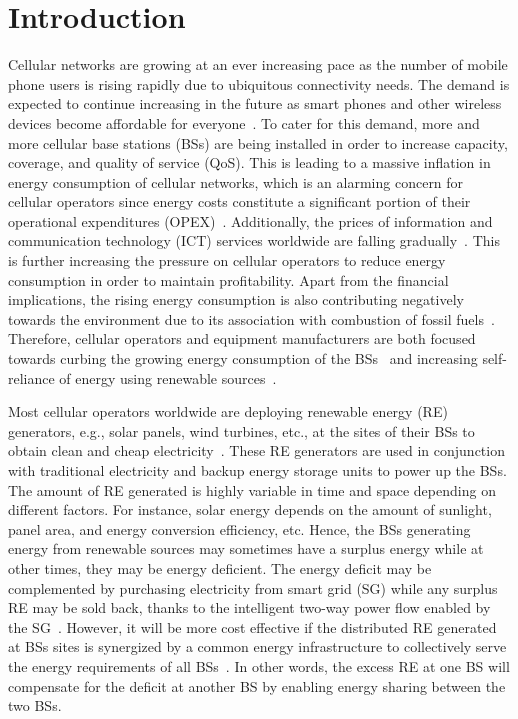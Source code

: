 \documentclass[10pt, letter,twocolumn]{IEEEtran}
\begin{document}
\section{Introduction}
Cellular networks are growing at an ever increasing pace as the number of mobile phone users is rising rapidly due to ubiquitous connectivity needs. The demand is expected to continue increasing in the future as smart phones and other wireless devices become affordable for everyone~\cite{cisco_report}. To cater for this demand, more and more cellular base stations (BSs) are being installed in order to increase capacity, coverage, and quality of service (QoS). This is leading to a massive inflation in energy consumption of cellular networks, which is an alarming concern for cellular operators since energy costs constitute a significant portion of their operational expenditures (OPEX)~\cite{opex}. Additionally, the prices of information and communication technology (ICT) services worldwide are falling gradually~\cite{falling_prices}. This is further increasing the pressure on cellular operators to reduce energy consumption in order to maintain profitability. Apart from the financial implications, the rising energy consumption is also contributing negatively towards the environment due to its association with combustion of fossil fuels~\cite{footprint_of_communication}. Therefore, cellular operators and equipment manufacturers are both focused towards curbing the growing energy consumption of the BSs~\cite{energy_consumption2} and increasing self-reliance of energy using renewable sources~\cite{flatten_energy}.

Most cellular operators worldwide are deploying renewable energy (RE) generators, e.g., solar panels, wind turbines, etc., at the sites of their BSs to obtain clean and cheap electricity~\cite{solar_powered_BS,solar_installation,suggested3}. These RE generators are used in conjunction with traditional electricity and backup energy storage units to power up the BSs. The amount of RE generated is highly variable in time and space depending on different factors. For instance, solar energy depends on the amount of sunlight, panel area, and energy conversion efficiency, etc. Hence, the BSs generating energy from renewable sources may sometimes have a surplus energy while at other times, they may be energy deficient. The energy deficit may be complemented by purchasing electricity from smart grid (SG) while any surplus RE may be sold back, thanks to the intelligent two-way power flow enabled by the SG~\cite{smart_grid,7570259}. However, it will be more cost effective if the distributed RE generated at BSs sites is synergized by a common energy infrastructure to collectively serve the energy requirements of all BSs~\cite{micro_grid,micro-grid2,nirwan_ansari}. In other words, the excess RE at one BS will compensate for the deficit at another BS by enabling energy sharing between the two BSs.
\end{document}
